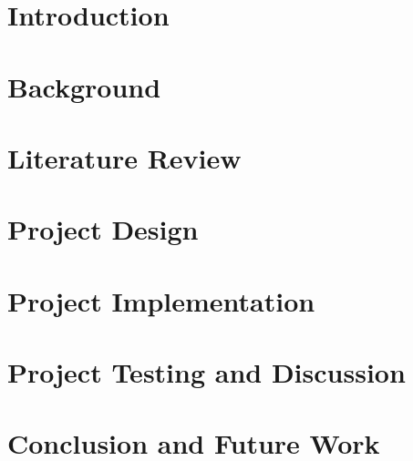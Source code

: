 \documentclass[12pt,twoside]{report}
\begin{document}








\tableofcontents

\listoffigures

\listoftables








\chapter{Introduction}


\chapter{Background}


\chapter{Literature Review}


\chapter{Project Design}


\chapter{Project Implementation }


\chapter{Project Testing and Discussion}


\chapter{Conclusion and Future Work}



\printbibliography
\end{document}
